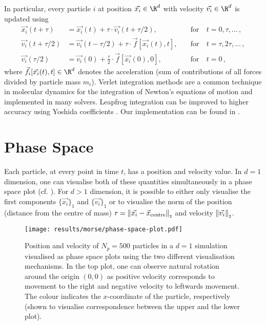 In particular, every particle $i$ at position $\vec{x_i} \in \R^d$ with velocity $\vec{v_i} \in \R^d$ is updated using
\begin{align*}
  \vec{x_i}(t+\tau)     & = \vec{x_i}(t)+\tau \cdot \vec{v_i}(t+\tau / 2),              & \quad\text{for}~ & t=0, \tau, \ldots\,,      \\
  \vec{v_i}(t+\tau / 2) & = \vec{v_i}(t-\tau/2) + \tau \cdot \vec{f}[\vec{x_i}(t), t],  & \quad\text{for}~ & t=\tau, 2 \tau, \ldots\,, \\
  \vec{v_i}(\tau / 2)   & = \vec{v_i}(0)+\frac{\tau}{2} \cdot \vec{f}[\vec{x_i}(0), 0], & \quad\text{for}~ & t=0\,,
\end{align*}
where $\vec{f_i}[\vec{x_i}(t), t] \in \R^d$ denotes the acceleration (sum of contributions of all forces divided by particle mass $m_i$).
Verlet integration methods are a common technique in molecular dynamics for the integration of Newton's equations of motion and implemented in many solvers.
Leapfrog integration can be improved to higher accuracy using Yoshida coefficients \parencite{1973-yoshida-coefficients}.
Our implementation can be found in .


\section{Phase Space}
Each particle, at every point in time $t$, has a position and velocity value.
In $d=1$ dimension, one can visualise both of these quantities simultaneously in a phase space plot (cf. ).
For $d > 1$ dimension, it is possible to either only visualise the first components $\{\vec{x_i}\}_1$ and $\{\vec{v_i}\}_1$ or to visualise the norm of the position (distance from the centre of mass) $r = \left\lVert\vec{x_i} - \vec{x}_{\text{centre}}\right\rVert_{\scriptscriptstyle 2}$ and velocity $\left\lVert\vec{v_i}\right\rVert_{\scriptscriptstyle 2}$.

\begin{figure}[H]
  \centering
  \texttt{[image: results/morse/phase-space-plot.pdf]}
  \caption[Phase Space Plots]{Position and velocity of $N_p = 500$ particles in a $d=1$ simulation visualised as phase space plots using the two different visualisation mechanisms. In the top plot, one can observe natural rotation around the origin $(0, 0)$ as positive velocity corresponds to movement to the right and negative velocity to leftwards movement. The colour indicates the $x$-coordinate of the particle, respectively (shown to visualise correspondence between the upper and the lower plot).}
  \label{fig:phase-space-plot}
\end{figure}

